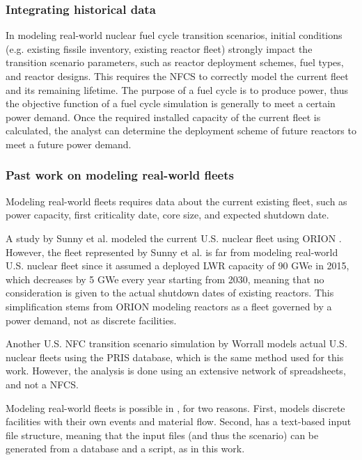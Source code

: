 \subsubsection{Integrating historical data}
In modeling real-world nuclear fuel cycle transition scenarios, initial
conditions (e.g. existing fissile inventory, existing reactor fleet) 
strongly impact the transition scenario parameters, such as reactor deployment
schemes, fuel types, and reactor designs.
This requires the \gls{NFCS} to correctly model the current fleet and its
remaining lifetime. The purpose of a fuel cycle is to produce power, thus the objective
function of a fuel cycle simulation is generally to meet a certain power demand.
Once the required installed capacity of the current fleet is calculated,
the analyst can determine the deployment scheme of future reactors to meet a future
power demand. 

\subsubsection{Past work on modeling real-world fleets}
Modeling real-world fleets requires data about the current existing fleet,
such as power capacity, first criticality date, core size, and expected shutdown date.

A study by Sunny et al. modeled the current U.S. nuclear fleet
using ORION \cite{sunny_transition_2015}. However, the fleet represented
by Sunny et al. is far from
modeling real-world U.S. nuclear fleet since it assumed a deployed \gls{LWR} capacity
of 90 GWe in 2015, which decreases by 5 GWe every year starting from 2030,
meaning that no consideration is given to the actual shutdown dates of
existing reactors. This simplification stems from ORION modeling reactors as
a fleet governed by a power demand, not as discrete facilities.

Another U.S. \gls{NFC} transition scenario simulation by Worrall \cite{worrall_utilization_2013}
models actual U.S. nuclear fleets using the \gls{PRIS} database, which is the same
method used for this work. However, the analysis is done using an extensive
network of spreadsheets, and not a \gls{NFCS}.

Modeling real-world fleets is possible in \Cyclus, for two
reasons. First, \Cyclus models
discrete facilities with their own events and material flow.
Second, \Cyclus has a text-based input file structure, meaning that
the input files (and thus the scenario) can be generated from 
a database and a script, as in this work.


